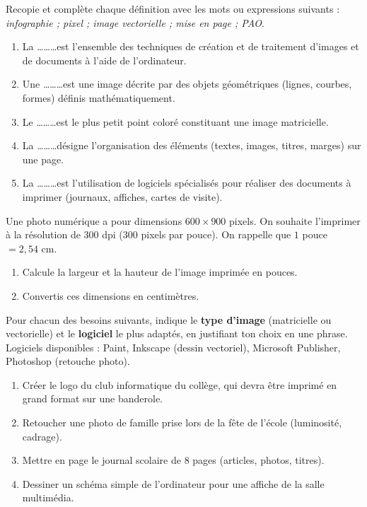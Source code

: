 \documentclass[11pt]{article}
\newcounter{popsec}
\newcounter{popsub}
\newcommand{\courssub}[1]{%
  \stepcounter{popsub}%
  \par\vspace{9pt}\noindent{\popxbold\fontsize{11.5}{13}\selectfont\color{popink}{\color{poporange}\thepopsec.\thepopsub}\hspace{6pt}#1}\par\nopagebreak\vspace{4pt}
}
\begin{document}
\begin{exercice}
Recopie et complète chaque définition avec les mots ou expressions suivants : \emph{infographie ; pixel ; image vectorielle ; mise en page ; PAO}.
\begin{enumerate}
\item La \ldots\ldots\ldots est l'ensemble des techniques de création et de traitement d'images et de documents à l'aide de l'ordinateur.
\item Une \ldots\ldots\ldots est une image décrite par des objets géométriques (lignes, courbes, formes) définis mathématiquement.
\item Le \ldots\ldots\ldots est le plus petit point coloré constituant une image matricielle.
\item La \ldots\ldots\ldots désigne l'organisation des éléments (textes, images, titres, marges) sur une page.
\item La \ldots\ldots\ldots est l'utilisation de logiciels spécialisés pour réaliser des documents à imprimer (journaux, affiches, cartes de visite).
\end{enumerate}
\end{exercice}

\begin{exercice}
Une photo numérique a pour dimensions $600 \times 900$ pixels. On souhaite l'imprimer à la résolution de $300$ dpi (300 pixels par pouce). On rappelle que $1$ pouce $= 2,54$ cm.
\begin{enumerate}
\item Calcule la largeur et la hauteur de l'image imprimée en pouces.
\item Convertis ces dimensions en centimètres.
\end{enumerate}
\end{exercice}

\courssub{Je m'entraîne}

\begin{exercice}
Pour chacun des besoins suivants, indique le \textbf{type d'image} (matricielle ou vectorielle) et le \textbf{logiciel} le plus adaptés, en justifiant ton choix en une phrase. Logiciels disponibles : Paint, Inkscape (dessin vectoriel), Microsoft Publisher, Photoshop (retouche photo).
\begin{enumerate}
\item Créer le logo du club informatique du collège, qui devra être imprimé en grand format sur une banderole.
\item Retoucher une photo de famille prise lors de la fête de l'école (luminosité, cadrage).
\item Mettre en page le journal scolaire de 8 pages (articles, photos, titres).
\item Dessiner un schéma simple de l'ordinateur pour une affiche de la salle multimédia.
\end{enumerate}
\end{exercice}
\end{document}
